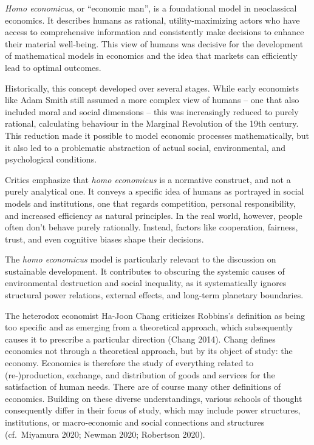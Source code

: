 \documentclass[
  a4paper,
  openany]{book}
\begin{document}
\begin{tcolorbox}[enhanced jigsaw, left=2mm, arc=.35mm, titlerule=0mm, opacityback=0, leftrule=.75mm, title={Homo economicus as the foundational model of human behaviour}, breakable, bottomtitle=1mm, rightrule=.15mm, coltitle=black, toptitle=1mm, bottomrule=.15mm, colback=white, opacitybacktitle=0.6, colbacktitle=quarto-callout-note-color!10!white, toprule=.15mm, colframe=quarto-callout-note-color-frame]

\emph{Homo economicus}, or ``economic man'', is a foundational model in
neoclassical economics. It describes humans as rational,
utility-maximizing actors who have access to comprehensive information
and consistently make decisions to enhance their material well-being.
This view of humans was decisive for the development of mathematical
models in economics and the idea that markets can efficiently lead to
optimal outcomes.

Historically, this concept developed over several stages. While early
economists like Adam Smith still assumed a more complex view of humans
-- one that also included moral and social dimensions -- this was
increasingly reduced to purely rational, calculating behaviour in the
Marginal Revolution of the 19th century. This reduction made it possible
to model economic processes mathematically, but it also led to a
problematic abstraction of actual social, environmental, and
psychological conditions.

Critics emphasize that \emph{homo economicus} is a normative construct,
and not a purely analytical one. It conveys a specific idea of humans as
portrayed in social models and institutions, one that regards
competition, personal responsibility, and increased efficiency as
natural principles. In the real world, however, people often don't
behave purely rationally. Instead, factors like cooperation, fairness,
trust, and even cognitive biases shape their decisions.

The \emph{homo economicus} model is particularly relevant to the
discussion on sustainable development. It contributes to obscuring the
systemic causes of environmental destruction and social inequality, as
it systematically ignores structural power relations, external effects,
and long-term planetary boundaries.

\end{tcolorbox}

The heterodox economist Ha-Joon Chang criticizes Robbins's definition as
being too specific and as emerging from a theoretical approach, which
subsequently causes it to prescribe a particular direction (Chang 2014).
Chang defines economics not through a theoretical approach, but by its
object of study: the economy. Economics is therefore the study of
everything related to (re-)production, exchange, and distribution of
goods and services for the satisfaction of human needs. There are of
course many other definitions of economics. Building on these diverse
understandings, various schools of thought consequently differ in their
focus of study, which may include power structures, institutions, or
macro-economic and social connections and structures (cf.~Miyamura 2020;
Newman 2020; Robertson 2020).
\end{document}
